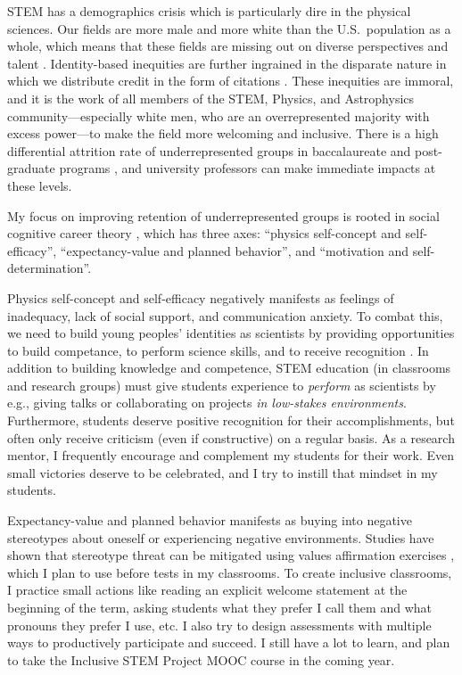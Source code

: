 \documentclass[11pt]{article}
\begin{document}
\thispagestyle{fancy}

\vspace{-0.2cm}
STEM has a demographics crisis which is particularly dire in the physical sciences. 
Our fields are more male and more white than the U.S.~population as a whole, which means that these fields are missing out on diverse perspectives and talent \citep{stem_laborforce_2021}. 
Identity-based inequities are further ingrained in the disparate nature in which we distribute credit in the form of citations \citep{teich_etal_2022}.
These inequities are immoral, and it is the work of all members of the STEM, Physics, and Astrophysics community---especially white men, who are an overrepresented majority with excess power---to make the field more welcoming and inclusive.
There is a high differential attrition rate of underrepresented groups in baccalaureate and post-graduate programs \citep{whitcomb_singh_2021}, and university professors can make immediate impacts at these levels.

My focus on improving retention of underrepresented groups is rooted in social cognitive career theory \citep{kelly_2016}, which has three axes: ``physics self-concept and self-efficacy'', ``expectancy-value and planned behavior'', and ``motivation and self-determination''.

Physics self-concept and self-efficacy negatively manifests as feelings of inadequacy, lack of social support, and communication anxiety.
To combat this, we need to build young peoples' identities as scientists by providing opportunities to build competance, to perform science skills, and to receive recognition  \citep{hazari_etal_2010}.
In addition to building knowledge and competence, STEM education (in classrooms and research groups) must give students experience to \emph{perform} as scientists by e.g., giving talks or collaborating on projects \emph{in low-stakes environments}.
Furthermore, students deserve positive recognition for their accomplishments, but often only receive criticism (even if constructive) on a regular basis.
As a research mentor, I frequently encourage and complement my students for their work. 
Even small victories deserve to be celebrated, and I try to instill that mindset in my students.

Expectancy-value and planned behavior manifests as buying into negative stereotypes about oneself or experiencing negative environments.
Studies have shown that stereotype threat can be mitigated using values affirmation exercises \citep{miyake_etal_2010}, which I plan to use before tests in my classrooms.
To create inclusive classrooms, I practice small actions like reading an explicit welcome statement at the beginning of the term, asking students what they prefer I call them and what pronouns they prefer I use, etc.
I also try to design assessments with multiple ways to productively participate and succeed.
I still have a lot to learn, and plan to take the Inclusive STEM Project MOOC course in the coming year.
\end{document}
